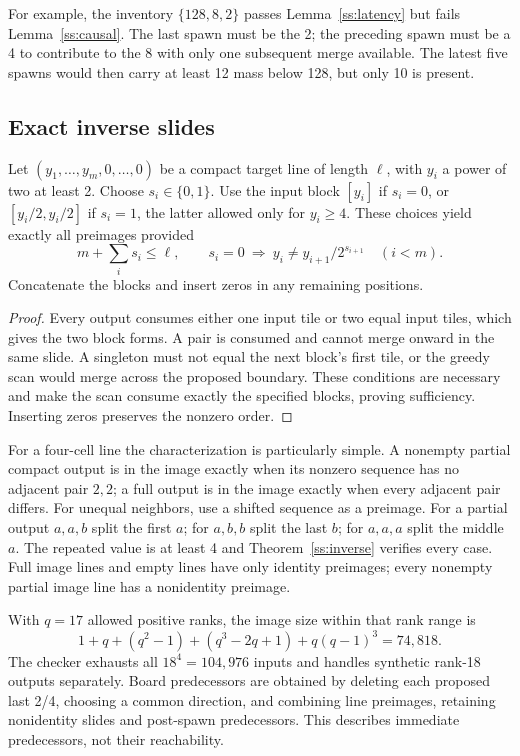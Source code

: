 For example, the inventory $\{128,8,2\}$ passes
Lemma~\ref{ss:latency} but fails Lemma~\ref{ss:causal}. The last spawn
must be the 2; the preceding spawn must be a 4 to contribute to the 8
with only one subsequent merge available. The latest five spawns would
then carry at least 12 mass below 128, but only 10 is present.

\subsection{Exact inverse slides}

\begin{theorem}\label{ss:inverse}
Let $(y_1,\ldots,y_m,0,\ldots,0)$ be a compact target line of length
$\ell$, with $y_i$ a power of two at least 2. Choose $s_i\in\{0,1\}$.
Use the input block $[y_i]$ if $s_i=0$, or $[y_i/2,y_i/2]$ if $s_i=1$,
the latter allowed only for $y_i\ge4$. These choices yield exactly all
preimages provided
\[
 m+\sum_i s_i\le\ell,\qquad
 s_i=0\ \Longrightarrow\ y_i\ne y_{i+1}/2^{s_{i+1}}
 \quad(i<m).
\]
Concatenate the blocks and insert zeros in any remaining positions.
\end{theorem}
\begin{proof}
Every output consumes either one input tile or two equal input tiles,
which gives the two block forms. A pair is consumed and cannot merge
onward in the same slide. A singleton must not equal the next block's
first tile, or the greedy scan would merge across the proposed boundary.
These conditions are necessary and make the scan consume exactly the
specified blocks, proving sufficiency. Inserting zeros preserves the
nonzero order.
\end{proof}

For a four-cell line the characterization is particularly simple.
A nonempty partial compact output is in the image exactly when its
nonzero sequence has no adjacent pair $2,2$; a full output is in the
image exactly when every adjacent pair differs. For unequal neighbors,
use a shifted sequence as a preimage. For a partial output $a,a,b$ split
the first $a$; for $a,b,b$ split the last $b$; for $a,a,a$ split the middle
$a$. The repeated value is at least 4 and Theorem~\ref{ss:inverse}
verifies every case. Full image lines and empty lines have only identity
preimages; every nonempty partial image line has a nonidentity preimage.

With $q=17$ allowed positive ranks, the image size within that rank range is
\[
 1+q+(q^2-1)+(q^3-2q+1)+q(q-1)^3=74{,}818.
\]
The checker exhausts all $18^4=104{,}976$ inputs and handles synthetic
rank-18 outputs separately. Board predecessors are obtained by deleting
each proposed last 2/4, choosing a common direction, and combining line
preimages, retaining nonidentity slides and post-spawn predecessors.
This describes immediate predecessors, not their reachability.

